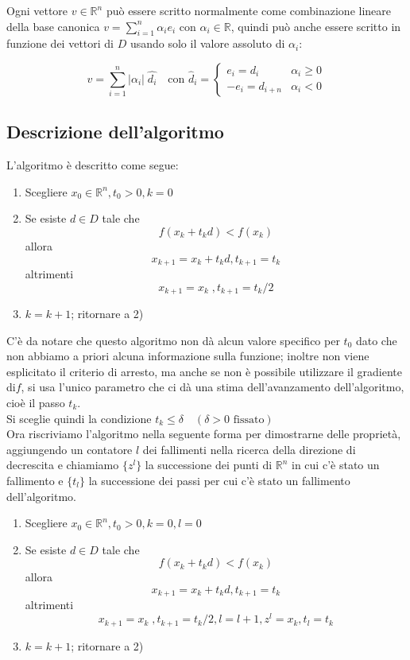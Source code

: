 Ogni vettore $v \in \mathbb{R}^n$ può essere scritto normalmente come
combinazione lineare della base canonica $v = \displaystyle
\sum_{i=1}^{n} \alpha_{i} e_{i}$ con $\alpha_i \in \mathbb{R}$, quindi
può anche essere scritto in funzione dei vettori di $D$ usando solo il
valore assoluto di $\alpha_i$:

$$ 
v = \displaystyle \sum_{i=1}^{n} |\alpha_i| \; \hat{d_i} \quad
\text{con } \hat d_i = \left\{
\begin{array}{ll} e_i = d_i & \alpha_i \geq 0 \\ -e_i = d_{i+n} &
\alpha_i < 0
\end{array} \right.
$$
\subsection{Descrizione dell'algoritmo} L'algoritmo \`e descritto come
segue:
\begin{enumerate}
 \item Scegliere $x_{0} \in \mathbb{R}^{n}, t_0 > 0, k=0$
 \item Se esiste $d \in D$ tale che
  $$f(x_{k} + t_kd) < f(x_{k})$$
 allora
 $$ x_{k+1} = x_{k} + t_k d, t_{k+1} = t_k $$
 altrimenti
 $$x_{k+1} = x_{k}\; , t_{k+1} = t_k/2 $$
\item $k= k+1$; ritornare a 2)
\end{enumerate}

C'\`e da notare che questo algoritmo non d\`a alcun valore specifico per
$t_0$ dato che non abbiamo a priori alcuna informazione sulla
funzione; inoltre non viene esplicitato il criterio di arresto, ma
anche se non \`e possibile utilizzare il gradiente di$f$, si usa l'unico
parametro che ci d\`a una stima dell'avanzamento dell'algoritmo, cio\`e il
passo $t_k$.\\ Si sceglie quindi la condizione $t_k \leq \delta \quad
(\delta > 0 \text{ fissato})$ \\

Ora riscriviamo l'algoritmo nella seguente forma per dimostrarne delle
propriet\`a, aggiungendo un contatore $l$ dei fallimenti nella ricerca
della direzione di decrescita e chiamiamo $ \{ z^{l} \}$ la
successione dei punti di $\mathbb{R}^{n}$ in cui c'\`e stato un fallimento e $\{ t_{l} \}$ la
successione dei passi per cui c'\`e stato un fallimento
dell'algoritmo.\\
 
\begin{enumerate}
 \item Scegliere $x_{0} \in \mathbb{R}^{n}, t_0 > 0, k=0, l=0$
 \item Se esiste $d \in D$ tale che
  $$f(x_{k} + t_kd) < f(x_{k})$$
 allora
 $$ x_{k+1} = x_{k} + t_k d, t_{k+1} = t_k $$
 altrimenti
 $$x_{k+1} = x_{k}\; , t_{k+1} = t_k/2, l=l+1, z^{l} = x_{k}, t_l = t_k$$
\item $k= k+1$; ritornare a 2)
\end{enumerate}

